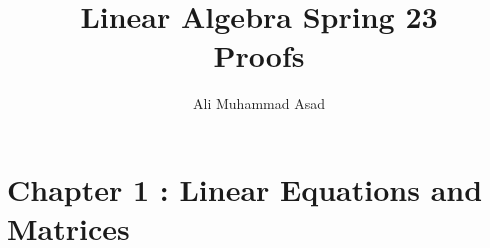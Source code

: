 \documentclass[addpoints]{exam}
\title{Linear Algebra Spring 23\\ Proofs}
\author{Ali Muhammad Asad}
\begin{document}
\maketitle
\section*{\textbf{Chapter 1 : Linear Equations and Matrices}}
\begin{questions}
    \question
    

\end{questions}
\end{document}
